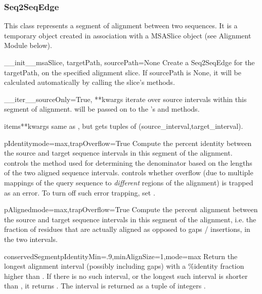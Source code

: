 \documentclass{howto}
\begin{document}
\subsubsection{Seq2SeqEdge}
This class represents a segment of alignment between two sequences.
It is a temporary object created in association with a MSASlice
object (see Alignment Module below).

\begin{funcdesc}{__init__}{msaSlice, targetPath, sourcePath=None}
  Create a Seq2SeqEdge for the targetPath, on the specified alignment
  slice.  If sourcePath is None, it will be calculated automatically
  by calling the slice's methods.
\end{funcdesc}

\begin{funcdesc}{__iter__}{sourceOnly=True, **kwargs}
  iterate over source intervals within this segment of alignment.
   will be passed on to the 's 
   and  methods.
\end{funcdesc}

\begin{funcdesc}{items}{**kwargs}
  same as , but gets tuples of (source_interval,target_interval).
\end{funcdesc}

\begin{funcdesc}{pIdentity}{mode=max,trapOverflow=True}
  Compute the percent identity between the source and target sequence
  intervals in this segment of the alignment.   controls
  the method used for determining the denominator based on the lengths of
  the two aligned sequence intervals.   controls
  whether overflow (due to multiple mappings of the query sequence to 
  {\em different} regions of the alignment) is trapped as an error.
  To turn off such error trapping, set .
\end{funcdesc}

\begin{funcdesc}{pAligned}{mode=max,trapOverflow=True}
  Compute the percent alignment between the source and target sequence
  intervals in this segment of the alignment, i.e. the fraction of
  residues that are actually aligned as opposed to gaps / insertions,
  in the two intervals.
\end{funcdesc}

\begin{funcdesc}{conservedSegment}{pIdentityMin=.9,minAlignSize=1,mode=max}
  Return the longest alignment interval (possibly including gaps) with
  a \%identity fraction higher than .  If there is no
  such interval, or the longest such interval
  is shorter than , it returns .  The interval
  is returned as a tuple of integers .
\end{funcdesc}
\end{document}

